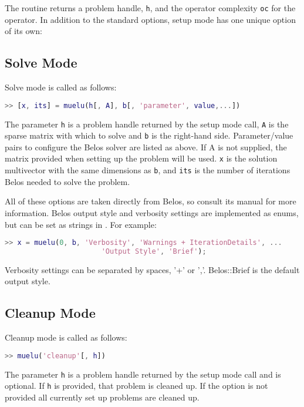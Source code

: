 The routine returns a problem handle, \texttt{h}, and the operator
complexity \texttt{oc} for the operator.  In addition to the standard
options, setup mode has one unique option of its own:


\subsection{Solve Mode}
Solve mode is called as follows:
\begin{lstlisting}[language=Matlab]
  >> [x, its] = muelu(h[, A], b[, 'parameter', value,...])
\end{lstlisting}
The parameter \texttt{h} is a problem handle returned by the
setup mode call, \texttt{A} is the sparse matrix with which to
solve and \texttt{b} is the right-hand side.  Parameter/value pairs
to configure the Belos solver are listed as above. If A is not supplied,
the matrix provided when setting up the problem will be used. \texttt{x} is
the solution multivector with the same dimensions as \texttt{b}, and \texttt{its}
is the number of iterations Belos needed to solve the problem.

All of these options are taken directly from Belos, so consult its
manual for more information. Belos output style and verbosity settings
are implemented as enums, but can be set as strings in \muemex. For example:

\begin{lstlisting}[language=Matlab]
  >> x = muelu(0, b, 'Verbosity', 'Warnings + IterationDetails', ...
                       'Output Style', 'Brief');
\end{lstlisting}

Verbosity settings can be separated by spaces, '+' or ','. Belos::Brief
is the default output style.

\subsection{Cleanup Mode}
Cleanup mode is called as follows:
\begin{lstlisting}[language=Matlab]
  >> muelu('cleanup'[, h])
\end{lstlisting}
The parameter \texttt{h} is a problem handle returned by the
setup mode call and is optional.  If \texttt{h} is provided, that
problem is cleaned up.  If the option is not provided all currently
set up problems are cleaned up.

